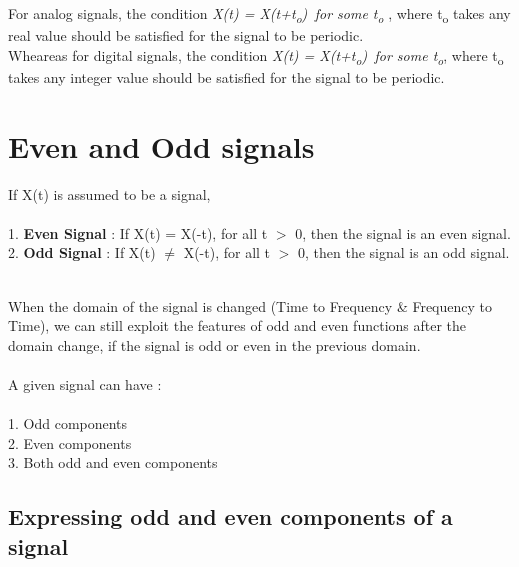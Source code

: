 \documentclass{article}
\begin{document}
For analog signals, the condition \textit{X(t) = X(t+t\textsubscript{o})\, for some t\textsubscript{o}} , where t\textsubscript{o} takes any real value should be satisfied for the signal to be periodic.\\

Wheareas for digital signals, the condition \textit{X(t) = X(t+t\textsubscript{o})\, for some t\textsubscript{o}}, where t\textsubscript{o} takes any integer value should be satisfied for the signal to be periodic.\\ 



\section{Even and Odd signals}
If X(t) is assumed to be a signal,\\\\
1. \textbf{Even Signal} : If X(t) = X(-t), for all t $>$ 0, then the signal is an even signal.\\
2. \textbf{Odd Signal} : If X(t) $\neq$ X(-t), for all t $>$ 0, then the signal is an odd signal.\\\\

\newpage

When the domain of the signal is changed (Time to Frequency \& Frequency to Time), we can still exploit the features of odd and even functions after the domain change, if the signal is odd or even in the previous domain.\\\\
A given signal can have :\\\\
1. Odd components\\
2. Even components\\
3. Both odd and even components\\
\subsection{Expressing odd and even components of a signal}
\end{document}
